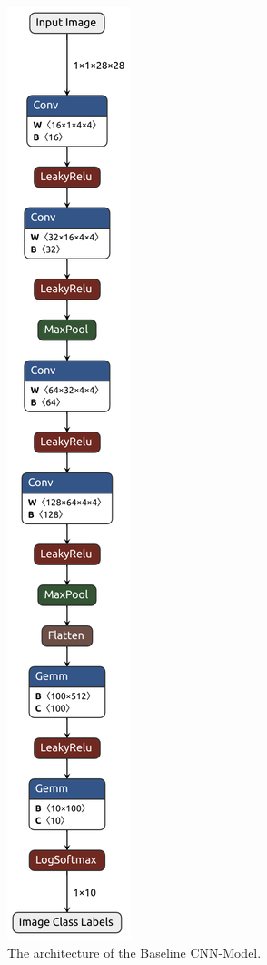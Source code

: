 \begin{figure}
    \includegraphics[width=0.6\linewidth]{figures/CNN_Architetcure.png}
    \caption{The architecture of the Baseline CNN-Model.}
    \label{fig:architecture}
    \vspace{-100pt} 
\end{figure}

